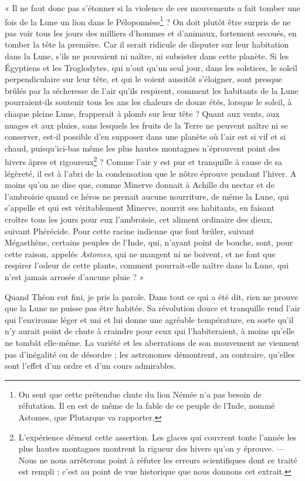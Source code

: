 \documentclass[a4paper, 11pt, oneside]{article}
\begin{document}
« Il ne faut donc pas s'étonner si la violence de ces mouvements a fait tomber une fois de la Lune un lion dans le Péloponnèse\footnote{On sent que cette prétendue chute du lion Némée n'a pas besoin de réfutation. Il en est de même de la fable de ce peuple de l'Inde, nommé Astomes, que Plutarque va rapporter.} ? On doit plutôt être surpris de ne pas voir tous les jours des milliers d'hommes et d'animaux, fortement secoués, en tomber la tête la première. Car il serait ridicule de disputer sur leur habitation dans la Lune, s'ils ne pouvaient ni naître, ni subsister dans cette planète. Si les Égyptiens et les Troglodytes, qui n'ont qu'un seul jour, dans les solstices, le soleil perpendiculaire sur leur tête, et qui le voient aussitôt s'éloigner, sont presque brûlés par la sécheresse de l'air qu'ils respirent, comment les habitants de la Lune pourraient-ils soutenir tous les ans les chaleurs de douze étés, lorsque le soleil, à chaque pleine Lune, frapperait à plomb sur leur tête ? Quant aux vents, aux nuages et aux pluies, sans lesquels les fruits de la Terre ne peuvent naître ni se conserver, est-il possible d'en supposer dans une planète où l'air est si vif et si chaud, puisqu'ici-bas même les plus hautes montagnes n'éprouvent point des hivers âpres et rigoureux\footnote{L'expérience dément cette assertion. Les glaces qui couvrent tonte l'année les plus hautes montagnes montrent la rigueur des hivers qu'on y éprouve. --- Nous ne nous arrêterons point à réfuter les erreurs scientifiques dont ce traité est rempli ; c'est au point de vue historique que nous donnons cet extrait.} ? Comme l'air y est pur et tranquille à cause de sa légèreté, il est à l'abri de la condensation que le nôtre éprouve pendant l'hiver. A moins qu'on ne dise que, comme Minerve donnait à Achille du nectar et de l'ambroisie quand ce héros ne prenait aucune nourriture, de même la Lune, qui s'appelle et qui est véritablement Minerve, nourrit ses habitants, en faisant croître tous les jours pour eux l'ambroisie, cet aliment ordinaire des dieux, suivant Phérécide. Pour cette racine indienne que font brûler, suivant Mégasthène, certains peuples de l'Inde, qui, n'ayant point de bouche, sont, pour cette raison, appelés \emph{Astomes}, qui ne mangent ni ne boivent, et ne font que respirer l'odeur de cette plante, comment pourrait-elle naître dans la Lune, qui n'est jamais arrosée d'aucune pluie ? »

Quand Théon eut fini, je pris la parole. Dans tout ce qui a été dit, rien ne prouve que la Lune ne puisse pas être habitée. Sa révolution douce et tranquille rend l'air qui l'environne léger et uni et lui donne une agréable température, en sorte qu'il n'y aurait point de chute à craindre pour ceux qui l'habiteraient, à moins qu'elle ne tombât elle-même. La variété et les aberrations de son mouvement ne viennent pas d'inégalité ou de désordre ; les astronomes démontrent, au contraire, qu'elles sont l'effet d'un ordre et d'un cours admirables.
\end{document}
